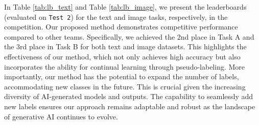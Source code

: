 In Table \ref{tab:lb_text} and Table \ref{tab:lb_image}, we present the leaderboards (evaluated on \texttt{Test 2}) for the text and image tasks, respectively, in the competition. Our proposed method demonstrates competitive performance compared to other teams. Specifically, we achieved the 2nd place in Task A and the 3rd place in Task B for both text and image datasets. This highlights the effectiveness of our method, which not only achieves high accuracy but also incorporates the ability for continual learning through pseudo-labeling. More importantly, our method has the potential to expand the number of labels, accommodating new classes in the future. This is crucial given the increasing diversity of AI-generated models and outputs. The capability to seamlessly add new labels ensures our approach remains adaptable and robust as the landscape of generative AI continues to evolve.
